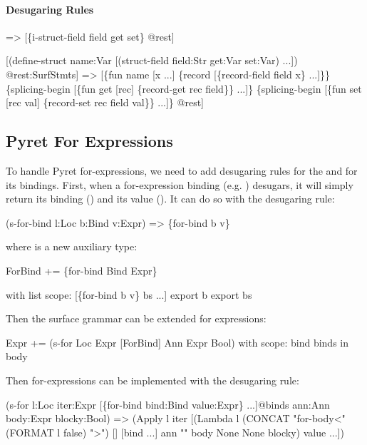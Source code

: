 \paragraph{Desugaring Rules}
\begin{Codes}
=> [\{i-struct-field field get set\} @rest]
  
   [(define-struct name:Var
      [(struct-field field:Str get:Var set:Var) ...]) @rest:SurfStmts]
=> [\{fun name [x ...] \{record [\{record-field field x\} ...]\}\}
    \{splicing-begin [\{fun get [rec] \{record-get rec field\}\} ...]\}
    \{splicing-begin [\{fun set [rec val] \{record-set rec field val\}\} ...]\}
    @rest]
\end{Codes}

\subsection{Pyret For Expressions}

To handle Pyret for-expressions, we need to add desugaring rules for
the  and for its bindings. 
First, when a for-expression binding (e.g. ) desugars,
it will simply return its binding () and its value ().
It can do so with the desugaring rule:
\begin{Codes}
   (s-for-bind l:Loc b:Bind v:Expr)
=> \{for-bind b v\}
\end{Codes}
where  is a new auxiliary type:
\begin{Codes}
ForBind += \{for-bind Bind Expr\}

with list scope:
  [\{for-bind b v\} bs ...]
  export b
  export bs
\end{Codes}

Then the surface grammar can be extended for  expressions:
\begin{Codes}
Expr += (s-for Loc Expr [ForBind] Ann Expr Bool)
with scope:
  bind binds in body
\end{Codes}

Then for-expressions can be implemented with the desugaring rule:
\begin{Codes}
   (s-for l:Loc
          iter:Expr
          [\{for-bind bind:Bind value:Expr\} ...]@binds
          ann:Ann
          body:Expr
          blocky:Bool)
=> (Apply l iter
     [(Lambda l (CONCAT "for-body<" (FORMAT l false) ">")
        [] [bind ...] ann "" body None None blocky)
      value ...])
\end{Codes}

